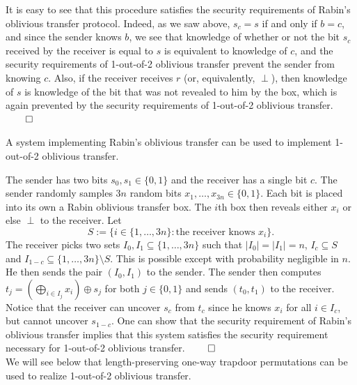 It is easy to see that this procedure satisfies the security requirements of Rabin's oblivious transfer protocol. Indeed, as we saw above, $s_c = s$ if and only if $b = c$, and since the sender knows $b$, we see that knowledge of whether or not the bit $s_c$ received by the receiver is equal to $s$ is equivalent to knowledge of $c$, and the security requirements of 1-out-of-2 oblivious transfer prevent the sender from knowing $c$. Also, if the receiver receives $r$ (or, equivalently, $\perp$), then knowledge of $s$ is knowledge of the bit that was not revealed to him by the box, which is again prevented by the security requirements of 1-out-of-2 oblivious transfer.  $\qed$

\begin{lemma}
A system implementing Rabin's oblivious transfer can be used to implement 1-out-of-2 oblivious transfer.
\end{lemma}

\proofsketch
The sender has two bits $s_0, s_1 \in \{0,1\}$ and the receiver has a single bit $c$. The sender randomly samples $3n$ random bits $x_1, \dotsc, x_{3n} \in \{0,1\}$. Each bit is placed into its own a Rabin oblivious transfer box. The $i$th box then reveals either $x_i$ or else $\perp$ to the receiver. Let 
\[ S := \{i \in \{1, \dotsc, 3n\} : \text{the receiver knows } x_i\}. \]
The receiver picks two sets $I_0, I_1 \subseteq \{1, \dotsc, 3n\}$ such that $ |I_0| = |I_1| = n$, $I_c \subseteq S$ and $I_{1-c} \subseteq \{1, \dotsc, 3n\} \setminus S$. This is possible except with probability negligible in $n$. He then sends the pair $(I_0, I_1)$ to the sender. The sender then computes $t_j= \left(\bigoplus_{i \in I_j}x_i \right) \oplus s_j$ for both $j \in \{0,1\}$ and sends $(t_0, t_1)$ to the receiver. \\

Notice that the receiver can uncover $s_c$ from $t_c$ since he knows $x_i$ for all $i \in I_c$, but cannot uncover $s_{1-c}$. One can show that the security requirement of Rabin's oblivious transfer implies that this system satisfies the security requirement necessary for 1-out-of-2 oblivious transfer. $\qed$ \\

We will see below that length-preserving one-way trapdoor permutations can be used to realize 1-out-of-2 oblivious transfer. 

